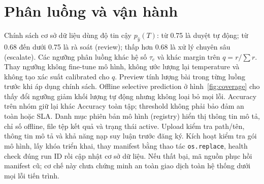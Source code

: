 \section{Phân luồng và vận hành}
Chính sách cơ sở dữ liệu dùng độ tin cậy $p_{\hat y}(T)$: từ 0.75 là duyệt tự động; từ 0.68 đến dưới 0.75 là rà soát (review); thấp hơn 0.68 là xử lý chuyên sâu (escalate). Các ngưỡng phân luồng khác hệ số $\tau_c$ và khác margin trên $q=r/\sum r$. Thay ngưỡng không fine-tune mô hình, không ước lượng lại temperature và không tạo xác suất calibrated cho $q$.
Preview tính lượng bài trong từng luồng trước khi áp dụng chính sách. Offline selective prediction ở hình~\ref{fig:coverage} cho thấy đổi ngưỡng giảm khối lượng tự động nhưng không loại bỏ mọi lỗi. Accuracy trên nhóm giữ lại khác Accuracy toàn tập; threshold không phải bảo đảm an toàn hoặc SLA.
Danh mục phiên bản mô hình (registry) hiển thị thông tin mô tả, chỉ số offline, file tệp kết quả và trạng thái active. Upload kiểm tra path/tên, thông tin mô tả và khả năng nạp suy luận trước đăng ký. Kích hoạt kiểm tra gói mô hình, lấy khóa triển khai, thay manifest bằng thao tác \texttt{os.replace}, health check đúng run ID rồi cập nhật cơ sở dữ liệu. Nếu thất bại, mã nguồn phục hồi manifest cũ; cơ chế này chưa chứng minh an toàn giao dịch toàn hệ thống dưới mọi lỗi tiến trình.

\FloatBarrier
